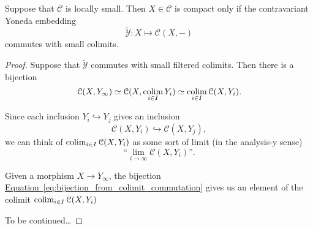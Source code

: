 \documentclass[main.tex]{subfiles}
\begin{document}
\begin{lemma}
  \label{lemma:compact_iff_contravariant_yoneda_commutes_with_colimits}
  Suppose that $\mathcal{C}$ is locally small. Then $X \in \mathcal{C}$ is compact only if the contravariant Yoneda embedding
  \begin{equation*}
    \tilde{\mathcal{Y}}\colon X \mapsto \mathcal{C}(X, -)
  \end{equation*}
  commutes with small colimits.
\end{lemma}
\begin{proof}
  Suppose that $\tilde{\mathcal{Y}}$ commutes with small filtered colimits. Then there is a bijection
  \begin{equation}
    \label{eq:bijection_from_colimit_commutation}
    \mathcal{C}(X, Y_{\infty}) \simeq \mathcal{C}(X, \operatorname*{colim}_{i \in I} Y_{i}) \simeq \operatorname*{colim}_{i \in I}\mathcal{C}(X, Y_{i}).
  \end{equation}

  Since each inclusion $Y_{i} \hookrightarrow Y_{j}$ gives an inclusion
  \begin{equation*}
    \mathcal{C}(X, Y_{i}) \hookrightarrow \mathcal{C}(X, Y_{j}),
  \end{equation*}
  we can think of $\operatorname*{colim}_{i \in I} \mathcal{C}(X, Y_{i})$ as some sort of limit (in the analysis-y sense)
  \begin{equation*}
    \text{``}\lim_{i \to \infty} \mathcal{C}(X, Y_{i})\text{''}.
  \end{equation*}

  Given a morphism $X \to Y_{\infty}$, the bijection \hyperref[eq:bijection_from_colimit_commutation]{Equation~\ref*{eq:bijection_from_colimit_commutation}} gives us an element of the colimit $\operatorname*{colim}_{i \in I}\mathcal{C}(X, Y_{i})$

  To be continued\dots
\end{proof}
\end{document}
